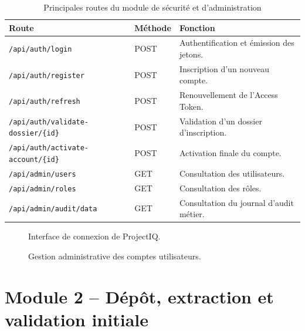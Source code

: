 \begin{table}[H]
\centering
\small
\caption{Principales routes du module de sécurité et d’administration}
\begin{tabularx}{\textwidth}{p{3.5cm}p{2cm}Y}
\toprule
\textbf{Route} & \textbf{Méthode} & \textbf{Fonction} \\
\midrule
\texttt{/api/auth/login} & POST & Authentification et émission des jetons. \\
\texttt{/api/auth/register} & POST & Inscription d’un nouveau compte. \\
\texttt{/api/auth/refresh} & POST & Renouvellement de l’Access Token. \\
\texttt{/api/auth/validate-dossier/\{id\}} & POST & Validation d’un dossier d’inscription. \\
\texttt{/api/auth/activate-account/\{id\}} & POST & Activation finale du compte. \\
\texttt{/api/admin/users} & GET & Consultation des utilisateurs. \\
\texttt{/api/admin/roles} & GET & Consultation des rôles. \\
\texttt{/api/admin/audit/data} & GET & Consultation du journal d’audit métier. \\
\bottomrule
\end{tabularx}
\end{table}

\begin{figure}[H]
\centering
\caption{Interface de connexion de ProjectIQ.}
\label{fig:login}
\end{figure}

\begin{figure}[H]
\centering
\caption{Gestion administrative des comptes utilisateurs.}
\label{fig:admin-users}
\end{figure}

\section{Module 2 -- Dépôt, extraction et validation initiale}

